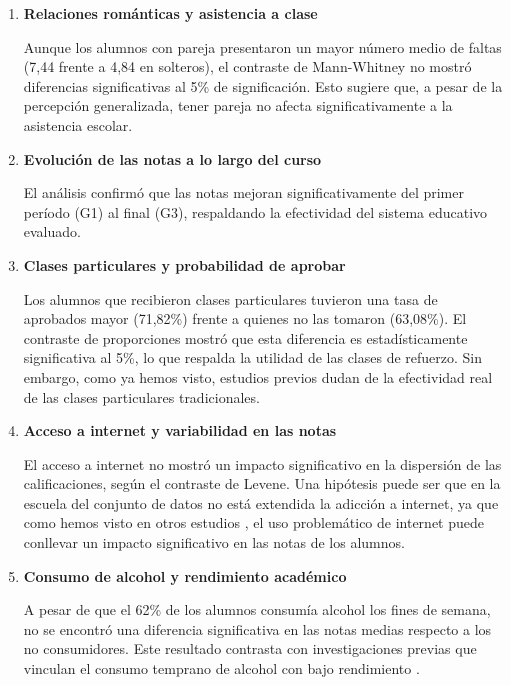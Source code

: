 \begin{enumerate}
    \item \textbf{Relaciones románticas y asistencia a clase}

    Aunque los alumnos con pareja presentaron un mayor número medio de faltas (7,44 frente a 4,84 en solteros), el contraste de Mann-Whitney no mostró diferencias significativas al 5\% de significación. Esto sugiere que, a pesar de la percepción generalizada, tener pareja no afecta significativamente a la asistencia escolar. 
    \item \textbf{Evolución de las notas a lo largo del curso}

    El análisis confirmó que las notas mejoran significativamente del primer período (G1) al final (G3), respaldando la efectividad del sistema educativo evaluado.

    \item \textbf{Clases particulares y probabilidad de aprobar}

    Los alumnos que recibieron clases particulares tuvieron una tasa de aprobados mayor (71,82\%) frente a quienes no las tomaron (63,08\%). El contraste de proporciones mostró que esta diferencia es estadísticamente significativa al 5\%, lo que respalda la utilidad de las clases de refuerzo. Sin embargo, como ya hemos visto, estudios previos \cite{baker2001worldwide} \cite{wiseman2021does} dudan de la efectividad real de las clases particulares tradicionales.

    \item \textbf{Acceso a internet y variabilidad en las notas}

    El acceso a internet no mostró un impacto significativo en la dispersión de las calificaciones, según el contraste de Levene. Una hipótesis puede ser que en la escuela del conjunto de datos no está extendida la adicción a internet, ya que como hemos visto en otros estudios \cite{vila2018rendimiento}, el uso problemático de internet puede conllevar un impacto significativo en las notas de los alumnos.

    \item \textbf{Consumo de alcohol y rendimiento académico}

    A pesar de que el 62\% de los alumnos consumía alcohol los fines de semana, no se encontró una diferencia significativa en las notas medias respecto a los no consumidores. Este resultado contrasta con investigaciones previas que vinculan el consumo temprano de alcohol con bajo rendimiento \cite{wagner2007alcohol}.
\end{enumerate}

